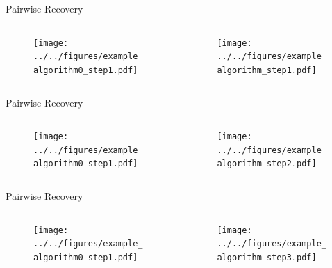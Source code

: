 \documentclass{beamer} %
\begin{document}
\begin{frame}{Pairwise Recovery}
  \begin{columns}
    \begin{column}{0.5\linewidth}
      \begin{figure}
        \texttt{[image: ../../figures/example\_algorithm0\_step1.pdf]}
      \end{figure}
    \end{column}

    \begin{column}{0.5\linewidth}
      \begin{figure}
        \texttt{[image: ../../figures/example\_algorithm\_step1.pdf]}
      \end{figure}
    \end{column}
  \end{columns}
\end{frame}


\begin{frame}{Pairwise Recovery}
  \begin{columns}
    \begin{column}{0.5\linewidth}
      \begin{figure}
        \texttt{[image: ../../figures/example\_algorithm0\_step1.pdf]}
      \end{figure}
    \end{column}

    \begin{column}{0.5\linewidth}
      \begin{figure}
        \texttt{[image: ../../figures/example\_algorithm\_step2.pdf]}
      \end{figure}
    \end{column}
  \end{columns}
\end{frame}

\begin{frame}{Pairwise Recovery}
  \begin{columns}
    \begin{column}{0.5\linewidth}
      \begin{figure}
        \texttt{[image: ../../figures/example\_algorithm0\_step1.pdf]}
      \end{figure}
    \end{column}

    \begin{column}{0.5\linewidth}
      \begin{figure}
        \texttt{[image: ../../figures/example\_algorithm\_step3.pdf]}
      \end{figure}
    \end{column}
  \end{columns}
\end{frame}
\end{document}

